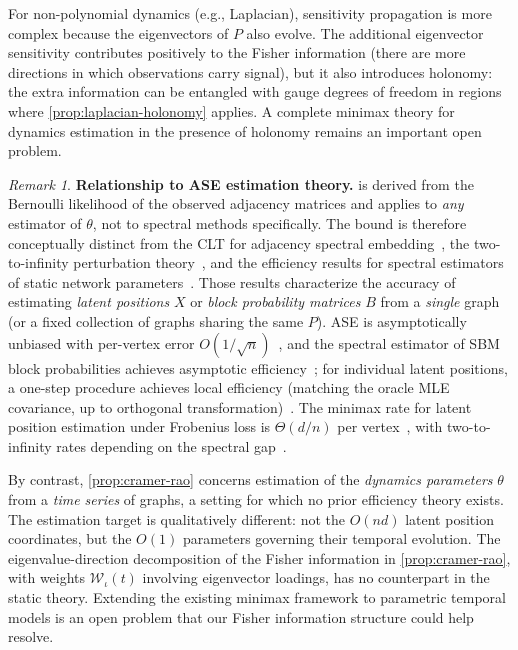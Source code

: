 \documentclass{article}
\theoremstyle{plain}
\theoremstyle{definition}
\theoremstyle{remark}
\newtheorem*{remark}{Remark}
\begin{document}
For non-polynomial dynamics (e.g., Laplacian), sensitivity propagation is more complex because the eigenvectors of $P$ also evolve.
The additional eigenvector sensitivity contributes positively to the Fisher information (there are more directions in which observations carry signal), but it also introduces holonomy: the extra information can be entangled with gauge degrees of freedom in regions where \cref{prop:laplacian-holonomy} applies.
A complete minimax theory for dynamics estimation in the presence of holonomy remains an important open problem.

\begin{remark}
\textbf{Relationship to ASE estimation theory.}
 is derived from the Bernoulli likelihood of the observed adjacency matrices and applies to \emph{any} estimator of $\theta$, not to spectral methods specifically.
The bound is therefore conceptually distinct from the CLT for adjacency spectral embedding~\citep{athreya2016limit,athreya2017statistical}, the two-to-infinity perturbation theory~\citep{cape2019two}, and the efficiency results for spectral estimators of static network parameters~\citep{tang2022efficient,xie2021efficient}.
Those results characterize the accuracy of estimating \emph{latent positions} $X$ or \emph{block probability matrices} $B$ from a \emph{single} graph (or a fixed collection of graphs sharing the same $P$).
ASE is asymptotically unbiased with per-vertex error $O(1/\sqrt{n})$~\citep{athreya2016limit}, and the spectral estimator of SBM block probabilities achieves asymptotic efficiency~\citep{tang2022efficient}; for individual latent positions, a one-step procedure achieves local efficiency (matching the oracle MLE covariance, up to orthogonal transformation)~\citep{xie2021efficient}.
The minimax rate for latent position estimation under Frobenius loss is $\Theta(d/n)$ per vertex~\citep{xie2020optimal}, with two-to-infinity rates depending on the spectral gap~\citep{agterberg2023minimax}.

By contrast, \cref{prop:cramer-rao} concerns estimation of the \emph{dynamics parameters} $\theta$ from a \emph{time series} of graphs, a setting for which no prior efficiency theory exists.
The estimation target is qualitatively different: not the $O(nd)$ latent position coordinates, but the $O(1)$ parameters governing their temporal evolution.
The eigenvalue-direction decomposition of the Fisher information in \cref{prop:cramer-rao}, with weights $\mathcal{W}_\iota(t)$ involving eigenvector loadings, has no counterpart in the static theory.
Extending the existing minimax framework to parametric temporal models is an open problem that our Fisher information structure could help resolve.


\end{remark}
\end{document}

